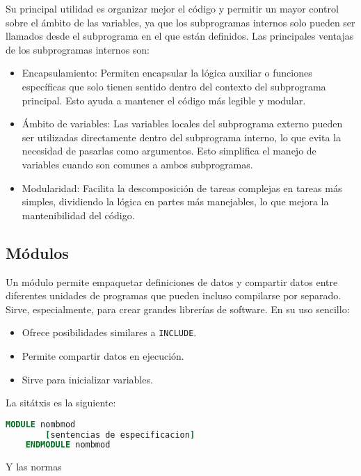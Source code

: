 Su principal utilidad es organizar mejor el código y permitir un mayor control sobre el ámbito de las variables, ya que los subprogramas internos solo pueden ser llamados desde el subprograma en el que están definidos. Las principales ventajas de los subprogramas internos son:

\begin{itemize}

	\item Encapsulamiento: Permiten encapsular la lógica auxiliar o funciones específicas que solo tienen sentido dentro del contexto del subprograma principal. Esto ayuda a mantener el código más legible y modular.

	\item Ámbito de variables: Las variables locales del subprograma externo pueden ser utilizadas directamente dentro del subprograma interno, lo que evita la necesidad de pasarlas como argumentos. Esto simplifica el manejo de variables cuando son comunes a ambos subprogramas.

	\item Modularidad: Facilita la descomposición de tareas complejas en tareas más simples, dividiendo la lógica en partes más manejables, lo que mejora la mantenibilidad del código.

\end{itemize}


\subsection{Módulos}

Un módulo permite empaquetar definiciones de datos y compartir datos entre diferentes unidades de programas que pueden incluso compilarse por separado. Sirve, especialmente, para crear grandes librerías de software. En su uso sencillo:

\begin{itemize}
	\item Ofrece posibilidades similares a {\tt INCLUDE}.
	\item Permite compartir datos en ejecución.
	\item Sirve para inicializar variables.
\end{itemize}

La sitátxis es la siguiente:

\begin{lstlisting}[language=Fortran]
	MODULE nombmod
		[sentencias de especificacion]
	ENDMODULE nombmod
\end{lstlisting}
Y las normas

